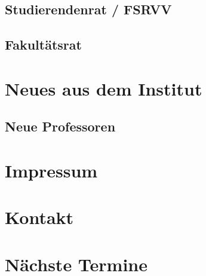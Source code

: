 \documentclass{fsinewsletter}
\begin{document}

\subsection{Studierendenrat / FSRVV}


\subsection{Fakultätsrat}

\newpage
\section{Neues aus dem Institut}

\subsection{Neue Professoren}

\newpage
\section{Impressum}


\section{Kontakt}

\section{Nächste Termine}

\end{document}
